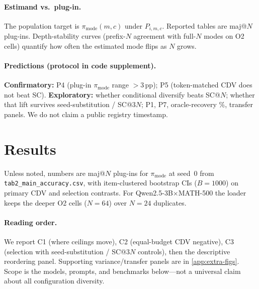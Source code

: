 \documentclass{article}
\newcommand{\pmode}{\pi_{\mathrm{mode}}}
\theoremstyle{plain}
\theoremstyle{definition}
\theoremstyle{remark}
\begin{document}
\paragraph{Estimand vs.\ plug-in.}
The population target is $\pmode(m,c)$ under $P_{i,m,c}$. Reported tables are
maj@$N$ plug-ins. Depth-stability curves (prefix-$N$ agreement with full-$N$
modes on O2 cells) quantify how often the estimated mode flips as $N$ grows.

\paragraph{Predictions (protocol in code supplement).}
\textbf{Confirmatory:} P4 (plug-in $\pmode$ range ${>}3$\,pp); P5 (token-matched
CDV does not beat SC). \textbf{Exploratory:} whether conditional diversify beats
SC@$N$; whether that lift survives seed-substitution / SC@$3N$; P1, P7,
oracle-recovery \%, transfer panels. We do not claim a public registry timestamp.

\section{Results}
\label{sec:results}

Unless noted, numbers are maj@$N$ plug-ins for $\pmode$ at seed~$0$ from
\texttt{tab2\_main\_accuracy.csv}, with item-clustered bootstrap CIs
($B{=}1000$) on primary CDV and selection contrasts. For
Qwen2.5-3B$\times$MATH-500 the loader keeps the deeper O2 cells ($N{=}64$) over
$N{=}24$ duplicates.

\paragraph{Reading order.} We report C1 (where ceilings move), C2 (equal-budget
CDV negative), C3 (selection with seed-substitution / SC@$3N$ controls), then
the descriptive reordering panel. Supporting variance/transfer panels are in
\cref{app:extra-figs}. Scope is the models, prompts, and benchmarks below---not
a universal claim about all configuration diversity.
\end{document}
